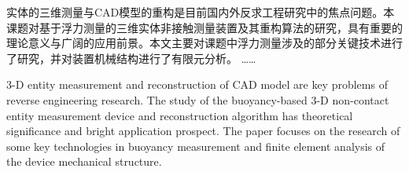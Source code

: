 

\begin{chineseabstract}
    实体的三维测量与CAD模型的重构是目前国内外反求工程研究中的焦点问题。本课题对基于浮力测量的三维实体非接触测量装置及其重构算法的研究，具有重要的理论意义与广阔的应用前景。本文主要对课题中浮力测量涉及的部分关键技术进行了研究，并对装置机械结构进行了有限元分析。
……

\end{chineseabstract}

\begin{englishabstract}
    3-D entity measurement and reconstruction of CAD model are key problems of reverse engineering research. The study of the buoyancy-based 3-D non-contact entity measurement device and reconstruction algorithm has theoretical significance and bright application prospect. The paper focuses on the research of some key technologies in buoyancy measurement and finite element analysis of the device mechanical structure.

\end{englishabstract}